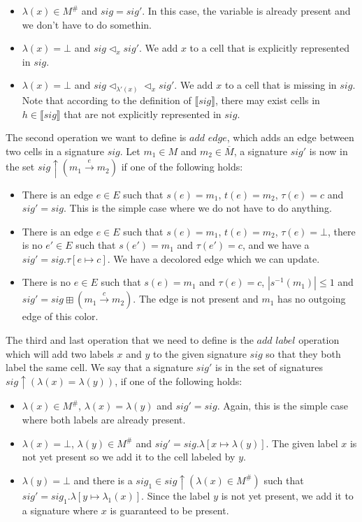 \begin{itemize}
	\item $\lambda(x) \in M^{\#}$ and $sig = sig'$. In this case, the variable is already present and we don't have to do somethin.
	\item $\lambda(x) = \bot$ and $sig \vartriangleleft_x sig'$. We add $x$ to a cell that is explicitly represented in $sig$.
	\item $\lambda(x) = \bot$ and $sig \vartriangleleft_{\lambda'(x)} \vartriangleleft_x sig'$. We add $x$ to a cell that is missing in $sig$. Note that according to the definition of 
	$\llbracket sig \rrbracket$, there may exist cells in $h \in \llbracket sig \rrbracket$ that are not explicitly represented in $sig$.
\end{itemize}

\noindent
The second operation we want to define is $add$ $edge$, which adds an edge between two cells in a signature $sig$. Let $m_1 \in M$ and $m_2 \in \overline{M}$, a signature $sig'$ is now in the set
$sig\uparrow(m_1 \xrightarrow{e} m_2)$ if one of the following holds:

\begin{itemize}
	\item There is an edge $e \in E$ such that $s(e) = m_1$, $t(e) = m_2$, $\tau(e) = c$ and $sig' = sig$. 
		This is the simple case where we do not have to do anything.
	\item There is an edge $e \in E$ such that $s(e) = m_1$, $t(e) = m_2$, $\tau(e) = \bot$, there is no $e' \in E$ such that
		$s(e') = m_1$ and $\tau(e') = c$, and we have a $sig' = sig.\tau [e \mapsto c]$. We have a decolored edge which we can update.
	\item There is no $e \in E$ such that $s(e) = m_1$ and $\tau(e) = c$, $|s^{-1}(m_1)| \le 1$ 
	and $sig' = sig \boxplus (m_1 \xrightarrow{c} m_2)$. The edge is not present and $m_1$ has no outgoing edge of this color.
\end{itemize}

\noindent
The third and last operation that we need to define is the $add$ $label$ operation which will add two labels $x$ and $y$ to the
given signature $sig$ so that they both label the same cell.
We say that a signature $sig'$ is in the set of signatures 
$sig\uparrow(\lambda(x) = \lambda(y))$, if one of the following
holds:

\begin{itemize}
	\item $\lambda(x) \in M^{\#}$, $\lambda(x) = \lambda(y)$ and $sig' = sig$. Again, this is the simple case where both labels are already present.
	\item $\lambda(x) = \bot$, $\lambda(y) \in M^{\#}$ and $sig' = sig.\lambda[x \mapsto \lambda(y)]$. The given label $x$ is not yet present so we add it to the cell labeled by $y$.
	\item $\lambda(y) = \bot$ and there is a $sig_1 \in sig\uparrow(\lambda(x) \in M^{\#})$ such that $sig' = sig_1.\lambda[y \mapsto \lambda_1(x)]$. Since the label $y$ is not yet present, we add it to a signature where $x$ is guaranteed to be present.
\end{itemize}

